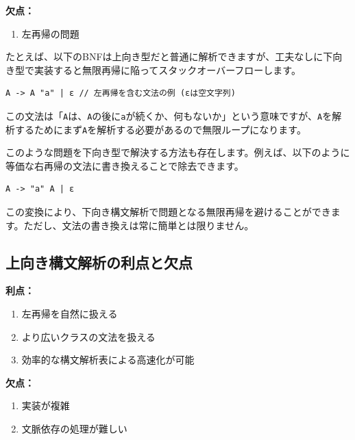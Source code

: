 \textbf{欠点：}

\begin{enumerate}
\def\labelenumi{\arabic{enumi}.}
\tightlist
\item
  左再帰の問題
\end{enumerate}

たとえば、以下のBNFは上向き型だと普通に解析できますが、工夫なしに下向き型で実装すると無限再帰に陥ってスタックオーバーフローします。

\begin{verbatim}
A -> A "a" | ε // 左再帰を含む文法の例 (εは空文字列)
\end{verbatim}

この文法は「\texttt{A}は、\texttt{A}の後に\texttt{a}が続くか、何もないか」という意味ですが、\texttt{A}を解析するためにまず\texttt{A}を解析する必要があるので無限ループになります。

このような問題を下向き型で解決する方法も存在します。例えば、以下のように等価な右再帰の文法に書き換えることで除去できます。

\begin{verbatim}
A -> "a" A | ε
\end{verbatim}

この変換により、下向き構文解析で問題となる無限再帰を避けることができます。ただし、文法の書き換えは常に簡単とは限りません。

\hypertarget{chapter5-ux4e0aux5411ux304dux69cbux6587ux89e3ux6790ux306eux5229ux70b9ux3068ux6b20ux70b9}{%
\subsection{上向き構文解析の利点と欠点}\label{chapter5-ux4e0aux5411ux304dux69cbux6587ux89e3ux6790ux306eux5229ux70b9ux3068ux6b20ux70b9}}

\textbf{利点：}

\begin{enumerate}
\def\labelenumi{\arabic{enumi}.}
\tightlist
\item
  左再帰を自然に扱える
\item
  より広いクラスの文法を扱える
\item
  効率的な構文解析表による高速化が可能
\end{enumerate}

\textbf{欠点：}

\begin{enumerate}
\def\labelenumi{\arabic{enumi}.}
\tightlist
\item
  実装が複雑
\item
  文脈依存の処理が難しい
\end{enumerate}

